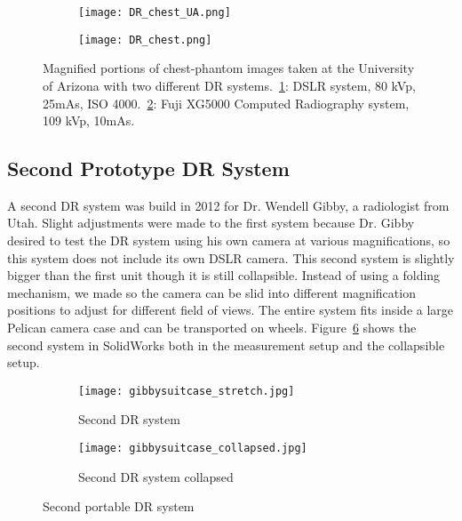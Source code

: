 \begin{figure}[h]
\centering
	\begin{subfigure}[b]{0.45\linewidth}
	\centering
	\texttt{[image: DR\_chest\_UA.png]}
	\caption{}
	\label{fig:DR_chest_film}
	\end{subfigure}
	\hspace{1 cm}
	\begin{subfigure}[b]{0.45\linewidth}
	\texttt{[image: DR\_chest.png]}
	\caption{}
	\label{fig:DR_chest}
	\end{subfigure}
\caption{Magnified portions of chest-phantom images taken at the University of Arizona with two different DR systems.~\ref{fig:DR_chest_film}: DSLR system, 80 kVp, 25mAs, ISO 4000.~\ref{fig:DR_chest}: Fuji XG5000 Computed Radiography system, 109 kVp, 10mAs.}
\label{fig:DR_chest_both}
\end{figure}

\subsection{Second Prototype DR System}
A second DR system was build in 2012 for Dr. Wendell Gibby, a radiologist from Utah.  Slight adjustments were made to the first system because Dr. Gibby desired to test the DR system using his own camera at various magnifications, so this system does not include its own DSLR camera.  This second system is slightly bigger than the first unit though it is still collapsible.  Instead of using a folding mechanism, we made so the camera can be slid into different magnification positions to adjust for different field of views.  The entire system fits inside a large Pelican camera case and can be transported on wheels.  Figure~\ref{fig:DR2} shows the second system in SolidWorks both in the measurement setup and the collapsible setup.

\begin{figure}[h]
	\begin{subfigure}[b]{0.45\linewidth}
	\centering
	\texttt{[image: gibbysuitcase\_stretch.jpg]}
	\caption{Second DR system}
	\label{DR2stretched}
	\end{subfigure}
\hspace{0.2cm}
	\begin{subfigure}[b]{0.45\linewidth}
	\centering
	\texttt{[image: gibbysuitcase\_collapsed.jpg]}
	\caption{Second DR system collapsed}
	\label{fig:DR2collapsed}
	\end{subfigure}
\caption{Second portable DR system}
\label{fig:DR2}	
\end{figure}

